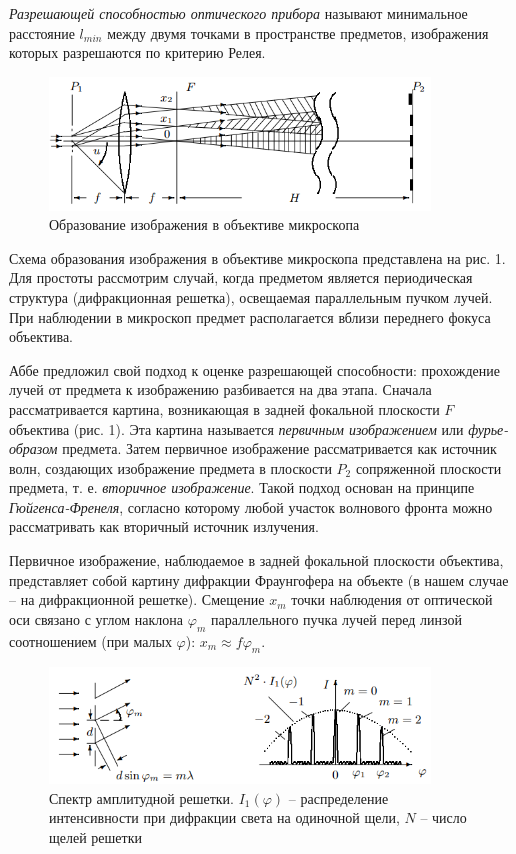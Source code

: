 \documentclass[a4paper,12pt]{article}
\begin{document}
\textit{Разрешающей способностью оптического прибора} называют минимальное расстояние $l_{min}$ между двумя точками в пространстве предметов, изображения которых разрешаются по критерию Релея.
\begin{figure}[H]\label{fig: Microscope scheme}
    \centering
    \includegraphics[width = 0.9\textwidth]{Microscope scheme.png}
    \caption{Образование изображения в объективе микроскопа}
\end{figure}

Схема образования изображения в объективе микроскопа представлена на рис. 1. Для простоты рассмотрим случай, когда предметом является периодическая структура (дифракционная решетка), освещаемая параллельным пучком лучей. При наблюдении в микроскоп предмет располагается вблизи переднего фокуса объектива.

Аббе предложил свой подход к оценке разрешающей способности: прохождение лучей от предмета к изображению разбивается на два этапа. Сначала рассматривается картина, возникающая в задней фокальной плоскости $F$ объектива (рис. 1). Эта картина называется \textit{первичным изображением} или \textit{фурье-образом} предмета. Затем первичное изображение рассматривается как источник волн, создающих изображение предмета в плоскости $P_2$ сопряженной плоскости предмета, т. е. \textit{вторичное изображение}. Такой подход основан на принципе \textit{Гюйгенса-Френеля}, согласно которому любой участок волнового фронта можно рассматривать как вторичный источник излучения.

Первичное изображение, наблюдаемое в задней фокальной плоскости объектива, представляет собой картину дифракции Фраунгофера на объекте (в нашем случае -- на дифракционной решетке). Смещение $x_m$ точки наблюдения от оптической оси связано с углом наклона $\varphi_m$ параллельного пучка лучей перед линзой соотношением (при малых $\varphi$):
$x_m \approx f \varphi_m$.   
\begin{figure}[H]\label{fig: Fraunhofer diffraction intensity}
    \centering
    \includegraphics[width = 0.9\textwidth]{Fraunhofer diffraction intensity.png}
    \caption{Спектр амплитудной решетки. $I_1(\varphi)$ -- распределение интенсивности при дифракции света на одиночной щели, $N$ -- число щелей решетки}
\end{figure}
\end{document}
